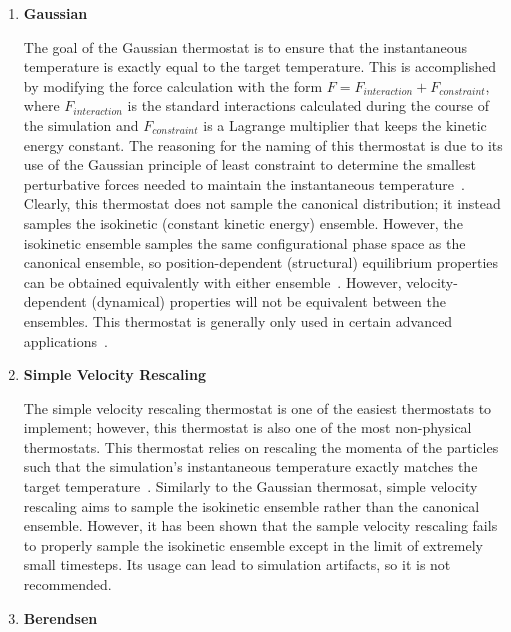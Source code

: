 \documentclass[9pt,bestpractices]{livecoms}
\begin{document}
\begin{enumerate}[listparindent=\parindent]

    \item \textbf{Gaussian}
        
        The goal of the Gaussian thermostat is to ensure that the instantaneous temperature is exactly equal to the target temperature.
        This is accomplished by modifying the force calculation with the form $F = F_{interaction} + F_{constraint}$, where $F_{interaction}$ is the standard interactions calculated during the course of the simulation and $F_{constraint}$ is a Lagrange multiplier that keeps the kinetic energy constant.
        The reasoning for the naming of this thermostat is due to its use of the Gaussian principle of least constraint to determine the smallest perturbative forces needed to maintain the instantaneous temperature~\cite{thermostatAlgorithms2005}.
        Clearly, this thermostat does not sample the canonical distribution; it instead samples the isokinetic (constant kinetic energy) ensemble.
        However, the isokinetic ensemble samples the same configurational phase space as the canonical ensemble, so position-dependent (structural) equilibrium properties can be obtained equivalently with either ensemble~\cite{Minary:2003:JChemPhysAlgorithms}.
        However, velocity-dependent (dynamical) properties will not be equivalent between the ensembles.
        This thermostat is generally only used in certain advanced applications~\cite{Minary:2003:JChemPhysAlgorithms}.

    \item \textbf{Simple Velocity Rescaling}

        The simple velocity rescaling thermostat is one of the easiest thermostats to implement; however, this thermostat is also one of the most non-physical thermostats.
        This thermostat relies on rescaling the momenta of the particles such that the simulation's instantaneous temperature exactly matches the target temperature~\cite{thermostatAlgorithms2005}.
        Similarly to the Gaussian thermosat, simple velocity rescaling aims to sample the isokinetic ensemble rather than the canonical ensemble.
        However, it has been shown that the sample velocity rescaling fails to properly sample the isokinetic ensemble except in the limit of extremely small timesteps\cite{Braun:2018}.
        Its usage can lead to simulation artifacts, so it is not recommended\cite{Harvey:1998:JCompChem,Braun:2018}.

    \item \textbf{Berendsen}


\end{enumerate}
\end{document}
